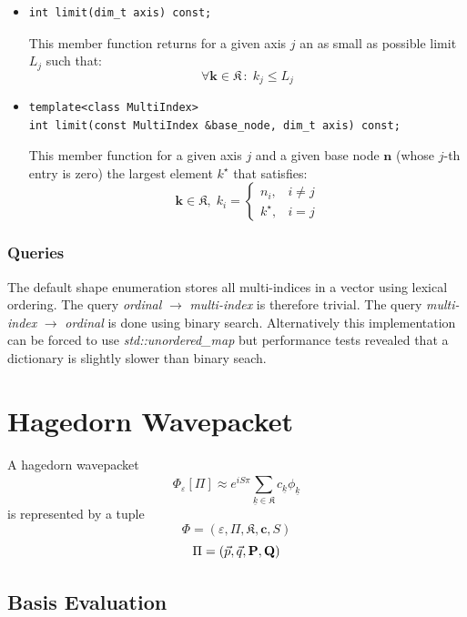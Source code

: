 \documentclass{article}
\begin{document}
\begin{itemize}
\item
\begin{verbatim}
int limit(dim_t axis) const;
\end{verbatim}
This member function returns for a given axis \( j \) an as small as possible limit \( L_j \) such that:
\[ \forall \boldsymbol{k} \in \mathfrak{K} \,\colon\; k_j \leq L_j \]

\item
\begin{verbatim}
template<class MultiIndex>
int limit(const MultiIndex &base_node, dim_t axis) const;
\end{verbatim}
This member function for a given axis \( j \) and a given base node \( \boldsymbol{n} \) (whose \( j \)-th entry is zero)
the largest element \( k^\star \) that satisfies: 
\[ \boldsymbol{k} \in \mathfrak{K}, \;
k_i =
   \begin{cases}
      n_i,& i \neq j\\
      k^\star, & i = j
   \end{cases}
\]

\end{itemize}

\subsubsection{Queries}
The default shape enumeration stores all multi-indices in a vector using lexical ordering. The query \emph{ordinal} \(\rightarrow\) \emph{multi-index} is therefore trivial. The query \emph{multi-index} \(\rightarrow\) \emph{ordinal} is done using binary search. Alternatively this implementation can be forced to use \emph{std::unordered\_map} but performance tests revealed that a dictionary is slightly slower than binary seach.

\section{Hagedorn Wavepacket}
A hagedorn wavepacket
\[
\Phi_{\varepsilon}[\Pi] \approx e^{iS\pi} \sum_{\underline{k} \in \mathfrak{K}}^{} c_{\underline{k}} \phi_{\underline{k}} \]
is represented by a tuple
\[ \Phi = \left( \varepsilon, \Pi, \mathfrak{K}, \boldsymbol{c}, S \right) \]
\[ \Pi = \left( \vec{p}, \vec{q}, \mathbf{P}, \mathbf{Q} \right) \]

\subsection{Basis Evaluation}
\end{document}
